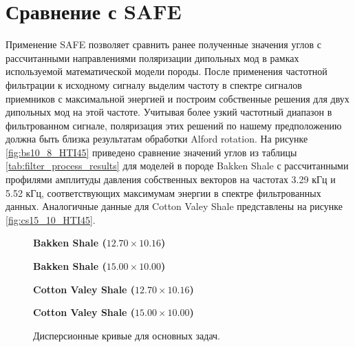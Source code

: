 \documentclass[a4paper,11pt]{article}
\begin{document}
\section{Сравнение с SAFE}
\label{safe_comparison}

Применение SAFE позволяет сравнить ранее полученные значения углов с рассчитанными направлениями поляризации дипольных мод в рамках используемой математической модели породы. После применения частотной фильтрации к исходному сигналу выделим частоту в спектре сигналов приемников с максимальной энергией и построим собственные решения для двух дипольных мод на этой частоте. Учитывая более узкий частотный диапазон в фильтрованном сигнале, поляризация этих решений по нашему предположению должна быть близка результатам обработки Alford rotation. На рисунке \ref{fig:bs10_8_HTI45} приведено сравнение значений углов из таблицы \ref{tab:filter_process_results} для моделей в породе Bakken Shale с рассчитанными профилями амплитуды давления собственных векторов на частотах 3.29 кГц и 5.52 кГц, соответствующих максимумам энергии в спектре фильтрованных данных. Аналогичные данные для Cotton Valey Shale представлены на рисунке \ref{fig:cs15_10_HTI45}.

\begin{figure}[h]
\centering
\begin{minipage}{0.49\linewidth}
	\centering \textbf{Bakken Shale ($12.70 \times 10.16$)}
	 \\
\end{minipage}
\begin{minipage}{0.49\linewidth}
	\centering \textbf{Bakken Shale ($15.00 \times 10.00$)}
	 \\
\end{minipage}
\begin{minipage}{0.49\linewidth}
	\centering \textbf{Cotton Valey Shale ($12.70 \times 10.16$)}
	 \\
\end{minipage}
\begin{minipage}{0.49\linewidth}
	\centering \textbf{Cotton Valey Shale ($15.00 \times 10.00$)}
	 \\
\end{minipage}
\caption{Дисперсионные кривые для основных задач. }
\label{fig:disp_curves_all}
\end{figure}
\end{document}

